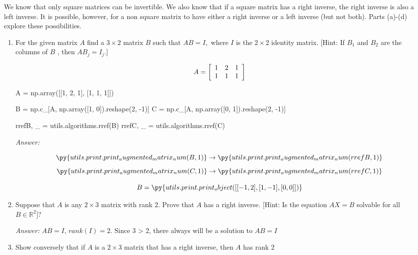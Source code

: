 \documentclass[letterpaper]{article}
\newcommand{\ans}{\textit{Answer: }}
\newenvironment{question}[2][Question]{\begin{trivlist}
\item[\hskip \labelsep {\bfseries #1}\hskip \labelsep {\bfseries #2.}]}{\end{trivlist}}
\newcommand{\printobj}[1]{\py{utils.print.print_object(#1)}}
\begin{document}
\begin{question}{3.88}
  We know that only square matrices can be invertible. We also know that if a
  square matrix has a right inverse, the right inverse is also a left inverse. It is
  possible, however, for a non square matrix to have either a right inverse or a
  left inverse (but not both). Parts (a)-(d) explore these possibilities.

  \begin{enumerate}[label=\textbf{(\alph*)}]
    \item For the given matrix $A$ find a $3 \times 2$ matrix $B$ such that $A B = I ,$ where
    $I$ is the $2 \times 2$ identity matrix. [Hint: If $B _ { 1 }$ and $B _ { 2 }$ are the columns of $B$ ,
    then $A B _ { j } = I _ { j } . ]$

    $$
    A = \left[ \begin{array} { l l l } { 1 } & { 2 } & { 1 } \\ { 1 } & { 1 } & { 1 } \end{array} \right]
    $$

    \begin{pycode}
A = np.array([[1, 2, 1], [1, 1, 1]])

B = np.c_[A, np.array([1, 0]).reshape(2, -1)]
C = np.c_[A, np.array([0, 1]).reshape(2, -1)]

rrefB, _ = utils.algorithms.rref(B)
rrefC, _ = utils.algorithms.rref(C)
    \end{pycode}

    \ans 

    $$
    \py{utils.print.print_augmented_matrix_num(B, 1)}
    \rightarrow
    \py{utils.print.print_augmented_matrix_num(rrefB, 1)}
    $$
    $$
    \py{utils.print.print_augmented_matrix_num(C, 1)}
    \rightarrow
    \py{utils.print.print_augmented_matrix_num(rrefC, 1)}
    $$

    $$B = \printobj{[
      [-1, 2],
      [1, -1],
      [0, 0]
    ]}$$

    \item Suppose that $A$ is any $2 \times 3$ matrix with rank $2 .$ Prove that $A$ has a right
    inverse. [Hint: Is the equation $A X = B$ solvable for all $B \in \mathbb { R } ^ { 2 } ] ?$

    \ans $AB = I$, $rank(I) = 2$. Since 3 > 2, there always will be a solution to $AB = I$

    \item Show conversely that if $A$ is a $2 \times 3$ matrix that has a right inverse,
    then $A$ has rank 2


\end{enumerate}
\end{question}
\end{document}

